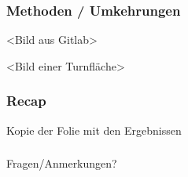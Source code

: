 \documentclass[8pt, aspectratio=169]{beamer}
\begin{document}
\begin{frame}
	\frametitle{Methoden / Umkehrungen}
	\vspace{-1cm}\hspace{-0.5cm}
	\begin{minipage}[t]{.49\textwidth}
		\centering
		<Bild aus Gitlab>
	\end{minipage}
	\begin{minipage}[t]{.49\textwidth}
		\centering
		<Bild einer Turnfläche>
	\end{minipage}
\end{frame}

\begin{frame}
	\frametitle{Recap}
	\begin{minipage}[t]{\textwidth}
		\centering
		Kopie der Folie mit den Ergebnissen
	\end{minipage}
\end{frame}

\begin{frame}
	\frametitle{}
	\begin{minipage}[t]{\textwidth}
		\centering
		\Large Fragen/Anmerkungen?
	\end{minipage}
\end{frame}
\end{document}
